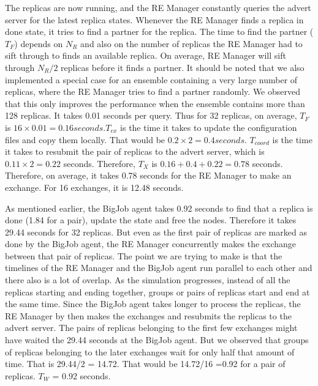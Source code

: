 \documentclass{rspublic}
\begin{document}
The replicas are now running, and the RE Manager constantly
queries the advert server for the latest replica states. Whenever the
RE Manager finds a replica in done state, it tries to find a partner
for the replica. The time to find the partner ($T_F$)
depends on $N_R$ and also on the number of replicas the RE Manager had
to sift through to finds an available replica. On average, RE Manager
will sift through $N_R/2$ replicas before it finds a partner. It
should be noted that we also implemented a special case for an ensemble containing a very large
number of replicas, where the RE Manager tries to find a
partner randomly. We observed that this only improves the performance
when the ensemble contains more than 128 replicas. It takes 0.01
seconds per query. Thus for 32 replicas, on average, $T_F$ is
$16\times 0.01=0.16 seconds. T_{ex}$ is the time it takes to update
the configuration files and copy them locally. That would be
$0.2\times 2=0.4 seconds.$ $T_{coord}$ is the time it takes to
resubmit the pair of replicas to the advert server, which is
$0.11\times 2 = 0.22$ seconds. Therefore, $T_X$ is
$0.16+0.4+0.22=0.78$ seconds. Therefore, on average, it takes 0.78
seconds for the RE Manager to make an exchange. For 16 exchanges, it
is 12.48 seconds.

As mentioned earlier, the BigJob agent takes 0.92 seconds to find that
a replica is done (1.84 for a pair), update the state and free the
nodes. Therefore it takes 29.44 seconds for 32 replicas. But even as
the first pair of replicas are marked as done by the BigJob agent, the
RE Manager concurrently makes the exchange between that pair of
replicas. The point we are trying to make is that the timelines of the
RE Manager and the BigJob agent run parallel to each other and there
also is a lot of overlap.  As the simulation progresses, instead of
all the replicas starting and ending together, groups or pairs of
replicas start and end at the same time.  Since the BigJob agent takes
longer to process the replicas, the RE Manager by then makes the
exchanges and resubmits the replicas to the advert server. The pairs
of replicas belonging to the first few exchanges might have waited the
29.44 seconds at the BigJob agent. But we observed that groups of
replicas belonging to the later exchanges wait for only half that
amount of time. That is 29.44/2 = 14.72. That would be 14.72/16 =0.92
for a pair of replicas. $T_W$ = 0.92 seconds.

\end{document}
